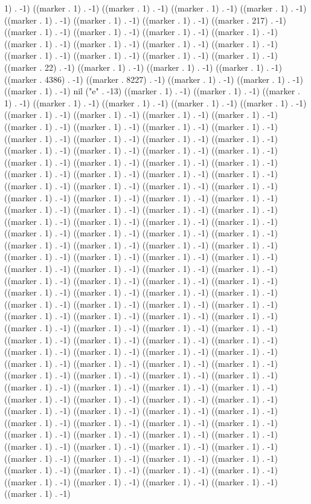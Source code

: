1) . -1) ((marker . 1) . -1) ((marker . 1) . -1) ((marker . 1) . -1) ((marker . 1) . -1) ((marker . 1) . -1) ((marker . 1) . -1) ((marker . 1) . -1) ((marker . 217) . -1) ((marker . 1) . -1) ((marker . 1) . -1) ((marker . 1) . -1) ((marker . 1) . -1) ((marker . 1) . -1) ((marker . 1) . -1) ((marker . 1) . -1) ((marker . 1) . -1) ((marker . 1) . -1) ((marker . 1) . -1) ((marker . 1) . -1) ((marker . 1) . -1) ((marker . 22) . -1) ((marker . 1) . -1) ((marker . 1) . -1) ((marker . 1) . -1) ((marker . 4386) . -1) ((marker . 8227) . -1) ((marker . 1) . -1) ((marker . 1) . -1) ((marker . 1) . -1) nil ("e" . -13) ((marker . 1) . -1) ((marker . 1) . -1) ((marker . 1) . -1) ((marker . 1) . -1) ((marker . 1) . -1) ((marker . 1) . -1) ((marker . 1) . -1) ((marker . 1) . -1) ((marker . 1) . -1) ((marker . 1) . -1) ((marker . 1) . -1) ((marker . 1) . -1) ((marker . 1) . -1) ((marker . 1) . -1) ((marker . 1) . -1) ((marker . 1) . -1) ((marker . 1) . -1) ((marker . 1) . -1) ((marker . 1) . -1) ((marker . 1) . -1) ((marker . 1) . -1) ((marker . 1) . -1) ((marker . 1) . -1) ((marker . 1) . -1) ((marker . 1) . -1) ((marker . 1) . -1) ((marker . 1) . -1) ((marker . 1) . -1) ((marker . 1) . -1) ((marker . 1) . -1) ((marker . 1) . -1) ((marker . 1) . -1) ((marker . 1) . -1) ((marker . 1) . -1) ((marker . 1) . -1) ((marker . 1) . -1) ((marker . 1) . -1) ((marker . 1) . -1) ((marker . 1) . -1) ((marker . 1) . -1) ((marker . 1) . -1) ((marker . 1) . -1) ((marker . 1) . -1) ((marker . 1) . -1) ((marker . 1) . -1) ((marker . 1) . -1) ((marker . 1) . -1) ((marker . 1) . -1) ((marker . 1) . -1) ((marker . 1) . -1) ((marker . 1) . -1) ((marker . 1) . -1) ((marker . 1) . -1) ((marker . 1) . -1) ((marker . 1) . -1) ((marker . 1) . -1) ((marker . 1) . -1) ((marker . 1) . -1) ((marker . 1) . -1) ((marker . 1) . -1) ((marker . 1) . -1) ((marker . 1) . -1) ((marker . 1) . -1) ((marker . 1) . -1) ((marker . 1) . -1) ((marker . 1) . -1) ((marker . 1) . -1) ((marker . 1) . -1) ((marker . 1) . -1) ((marker . 1) . -1) ((marker . 1) . -1) ((marker . 1) . -1) ((marker . 1) . -1) ((marker . 1) . -1) ((marker . 1) . -1) ((marker . 1) . -1) ((marker . 1) . -1) ((marker . 1) . -1) ((marker . 1) . -1) ((marker . 1) . -1) ((marker . 1) . -1) ((marker . 1) . -1) ((marker . 1) . -1) ((marker . 1) . -1) ((marker . 1) . -1) ((marker . 1) . -1) ((marker . 1) . -1) ((marker . 1) . -1) ((marker . 1) . -1) ((marker . 1) . -1) ((marker . 1) . -1) ((marker . 1) . -1) ((marker . 1) . -1) ((marker . 1) . -1) ((marker . 1) . -1) ((marker . 1) . -1) ((marker . 1) . -1) ((marker . 1) . -1) ((marker . 1) . -1) ((marker . 1) . -1) ((marker . 1) . -1) ((marker . 1) . -1) ((marker . 1) . -1) ((marker . 1) . -1) ((marker . 1) . -1) ((marker . 1) . -1) ((marker . 1) . -1) ((marker . 1) . -1) ((marker . 1) . -1) ((marker . 1) . -1) ((marker . 1) . -1) ((marker . 1) . -1) ((marker . 1) . -1) ((marker . 1) . -1) ((marker . 1) . -1) ((marker . 1) . -1) ((marker . 1) . -1) ((marker . 1) . -1) ((marker . 1) . -1) ((marker . 1) . -1) ((marker . 1) . -1) ((marker . 1) . -1) ((marker . 1) . -1) ((marker . 1) . -1) ((marker . 1) . -1) ((marker . 1) . -1) ((marker . 1) . -1) ((marker . 1) . -1) ((marker . 1) . -1) ((marker . 1) . -1) ((marker . 1) . -1) ((marker . 1) . -1) ((marker . 1) . -1) ((marker . 1) . -1) ((marker . 1) . -1) ((marker . 1) . -1) 